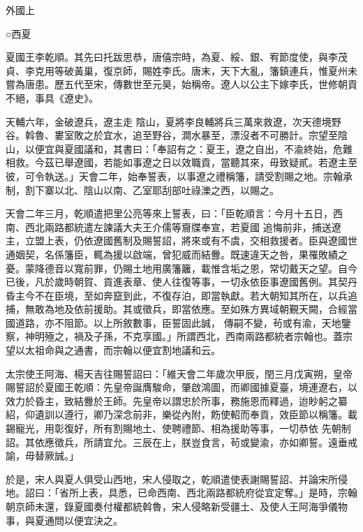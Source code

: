 
\begin{pinyinscope}

 外國上



 ○西夏



 夏國王李乾順。其先曰托跋思恭，唐僖宗時，為夏、綏、銀、宥節度使，與李茂貞、李克用等破黃巢，復京師，賜姓李氏。唐末，天下大亂，籓鎮連兵，惟夏州未嘗為唐患。歷五代至宋，傳數世至元昊，始稱帝。遼人以公主下嫁李氏，世修朝貢不絕，事具《遼史》。



 天輔六年，金破遼兵，遼主走
 陰山，夏將李良輔將兵三萬來救遼，次天德境野谷。斡魯、婁室敗之於宜水，追至野谷，澗水暴至，漂沒者不可勝計。宗望至陰山，以便宜與夏國議和，其書曰：「奉詔有之：夏王，遼之自出，不渝終始，危難相救。今茲已舉遼國，若能如事遼之日以效職貢，當聽其來，毋致疑貳。若遼主至彼，可令執送。」天會二年，始奉誓表，以事遼之禮稱籓，請受割賜之地。宗翰承制，割下寨以北、陰山以南、乙室耶刮部吐祿濼之西，以賜之。



 天會二年三月，乾順遣把里公亮等來上誓表，曰：「臣乾順言：今月十五日，西南、西北兩路都統遣左諫議大夫王介儒等齎牒奉宣，若夏國
 追悔前非，捕送遼主，立盟上表，仍依遼國舊制及賜誓詔，將來或有不虞，交相救援者。臣與遼國世通姻契，名係籓臣，輒為援以啟端，曾犯威而結釁。既速違天之咎，果罹敗績之憂。蒙降德音以寬前罪，仍賜土地用廣籓籬，載惟含垢之恩，常切戴天之望。自今已後，凡於歲時朝賀、貢進表章、使人往復等事，一切永依臣事遼國舊例。其契丹昏主今不在臣境，至如奔竄到此，不復存泊，即當執獻。若大朝知其所在，以兵追捕，無敢為地及依前援助。其或徵兵，即當依應。至如殊方異域朝覲天闕，合經當國道路，亦不阻節。以上所敘數事，臣誓固此誠，
 傳嗣不變，茍或有渝，天地鑒察，神明殛之，禍及子孫，不克享國。」所謂西北，西南兩路都統者宗翰也。蓋宗望以太祖命與之通書，而宗翰以便宜割地議和云。



 太宗使王阿海、楊天吉往賜誓詔曰：「維天會二年歲次甲辰，閏三月戊寅朔，皇帝賜誓詔於夏國王乾順：先皇帝誕膺駿命，肇啟鴻圖，而卿國據夏臺，境連遼右，以效力於昏主，致結釁於王師。先皇帝以謂忠於所事，務施恩而釋過，迨眇躬之纂紹，仰遺訓以遵行，卿乃深念前非，樂從內附，飭使軺而奉貢，效臣節以稱籓。載錫寵光，用彰復好，所有割賜地土、使聘禮節、相為援助等事，一切恭依
 先朝制詔。其依應徵兵，所請宜允。三辰在上，朕豈食言，茍或變渝，亦如卿誓。遠垂戒諭，毋替厥誠。」



 於是，宋人與夏人俱受山西地，宋人侵取之，乾順遣使表謝賜誓詔、并論宋所侵地。詔曰：「省所上表，具悉，已命西南、西北兩路都統府從宜定奪。」是時，宗翰朝京師未還，錄夏國奏付權都統斡魯，宋人侵略新受疆土、及使人王阿海爭儀物事，與夏通問以便宜決之。




\end{pinyinscope}

